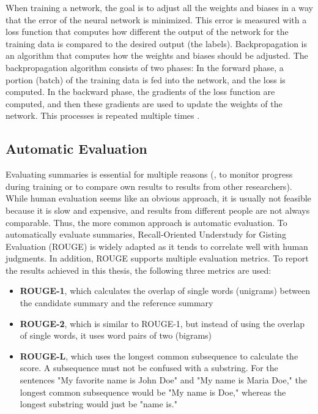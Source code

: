 When training a network, the goal is to adjust all the weights and biases in a way that the error of the neural network is minimized.
This error is measured with a loss function that computes how different the output of the network for the training data is compared to the desired output (the labels).
Backpropagation is an algorithm that computes how the weights and biases should be adjusted.
The backpropagation algorithm consists of two phases: In the forward phase, a portion (batch) of the training data is fed into the network, and the loss is computed.
In the backward phase, the gradients of the loss function are computed, and then these gradients are used to update the weights of the network.
This processes is repeated multiple times \cite[p.~21--24]{Aggarwal2018}.


\subsection{Automatic Evaluation}\label{ssec:automatic-evaluation}

Evaluating summaries is essential for multiple reasons (\eg, to monitor progress during training or to compare own results to results from other researchers).
While human evaluation seems like an obvious approach, it is usually not feasible because it is slow and expensive, and results from different people are not always comparable.
Thus, the more common approach is automatic evaluation.
To automatically evaluate summaries, Recall-Oriented Understudy for Gisting Evaluation (ROUGE) \cite{lin-2004-rouge} is widely adapted as it tends to correlate well with human judgments.
In addition, ROUGE supports multiple evaluation metrics.
To report the results achieved in this thesis, the following three metrics are used:
\begin{itemize}
\item \textbf{ROUGE-1}, which calculates the overlap of single words (unigrams) between the candidate summary and the reference summary
\item \textbf{ROUGE-2}, which is similar to ROUGE-1, but instead of using the overlap of single words, it uses word pairs of two (bigrams)
\item \textbf{ROUGE-L}, which uses the longest common subsequence to calculate the score. A subsequence must not be confused with a substring. For the sentences "My favorite name is John Doe" and "My name is Maria Doe," the longest common subsequence would be "My name is Doe," whereas the longest substring would just be "name is."
\end{itemize}

